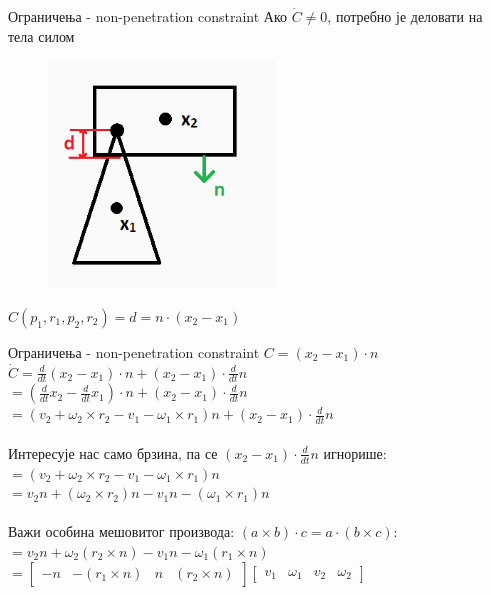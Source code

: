 \documentclass[]{beamer}
\begin{document}
\begin{frame}{Ограничења - non-penetration constraint}
    Ако $\dot{C} \neq 0$, потребно је деловати на тела силом
    \begin{figure}[htp]
        \centering
        \includegraphics[width=6cm]{img_01.png}
    \end{figure}
    $C(p_1, r_1, p_2, r_2) = d = n\cdot(x_2 - x_1)$
\end{frame}

\begin{frame}{Ограничења - non-penetration constraint}
    $C = (x_2 - x_1) \cdot n$ \\
    $\dot{C} = \frac{d}{dt}(x_2 - x_1) \cdot n + (x_2 - x_1)\cdot\frac{d}{dt}n$ \\
    $= (\frac{d}{dt}x_2 - \frac{d}{dt}x_1)\cdot n + (x_2 - x_1)\cdot\frac{d}{dt}n$ \\
    $= (v_2+\omega_2\times r_2-v_1-\omega_1\times r_1)n + (x_2 - x_1)\cdot\frac{d}{dt}n$ \\
    \\
    Интересује нас само брзина, па се $(x_2 - x_1)\cdot\frac{d}{dt}n$ игнорише: \\
    $= (v_2+\omega_2\times r_2-v_1-\omega_1\times r_1)n$ \\
    $= v_2 n + (\omega_2 \times r_2)n - v_1 n - (\omega_1 \times r_1)n$ \\
    \\
    Важи особина мешовитог производа: $(a \times b)\cdot c = a \cdot (b \times c):$ \\
    $= v_2 n + \omega_2 (r_2 \times n) - v_1 n - \omega_1 (r_1 \times n)$ \\
    $= \begin{bmatrix} -n & -(r_1 \times n) & n & (r_2 \times n)\end{bmatrix}
        \begin{bmatrix} v_1 & \omega_1 & v_2 & \omega_2 \end{bmatrix} $ \\
\end{frame}
\end{document}
